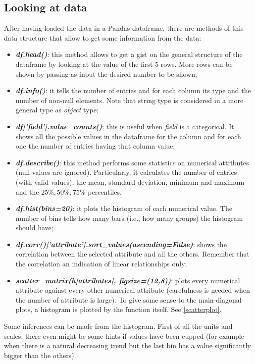 \documentclass[12pt, letterpaper]{article}
\theoremstyle{definition}
\begin{document}
\subsection{Looking at data}
After having loaded the data in a Pandas dataframe, there are methods of this data structure that allow to get some information from the data:
\begin{itemize}
\item \textbf{\textit{df.head()}}: this method allows to get a gist on the general structure of the dataframe by looking at the value of the first 5 rows. More rows can be shown by passing as input the desired number to be shown;

\item \textbf{\textit{df.info()}}: it tells the number of entries and for each column its type and the number of non-null elements. Note that string type is considered in a more general type as \textit{object} type;
\item \textbf{\textit{df['field'].value\_counts()}}: this is useful when \textit{field} is a categorical. It shows all the possible values in the dataframe for the column and for each one the number of entries having that column value;
\item \textbf{\textit{df.describe()}}: this method performs some statistics on numerical attributes (null values are ignored). Particularly, it calculates the number of entries (with valid values), the mean, standard deviation, minimum and maximum and the $25\%, 50\%, 75\%$ percentiles.
\item\textbf{\textit{df.hist(bins=20)}}: it plots the histogram of each numerical value. The number of bins tells how many bars (i.e., how many groups) the histogram should have;
\item\textbf{\textit{df.corr()['attribute'].sort\_values(ascending=False)}}: shows the correlation between the selected attribute and all the others. Remember that the correlation an indication of linear relationships only;
\item\textbf{\textit{scatter\_matrix(h[attributes], figsize=(12,8))}}: plots every numerical attribute against every other numerical attribute (carefulness is needed when the number of attribute is large). To give some sense to the main-diagonal plots, a histogram is plotted by the function itself. See \ref{scatterplot}.
\end{itemize}

Some inferences can be made from the histogram. First of all the units and scales; there even might be some hints if values have been cupped (for example when there is a natural decreasing trend but the last bin has a value significantly bigger than the others).
\end{document}
